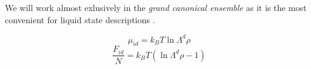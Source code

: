 We will work almost exlusively in the \emph{grand canonical ensemble} as it is the most convenient for liquid state descriptions%
.

\begin{equation}
  \mu_{id} = k_B T \ln{\Lambda^d \rho}
\end{equation}
\begin{equation}
  \frac{F_{id}}{N} = k_B T (\ln{\Lambda^d \rho} - 1)
\end{equation}
